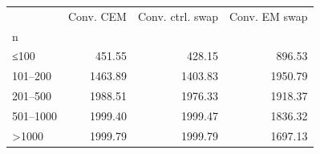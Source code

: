 \begin{tabular}{lrrr}
\toprule
 & Conv. CEM & Conv. ctrl. swap & Conv. EM swap \\
n &  &  &  \\
\midrule
≤100 & 451.55 & 428.15 & 896.53 \\
101–200 & 1463.89 & 1403.83 & 1950.79 \\
201–500 & 1988.51 & 1976.33 & 1918.37 \\
501–1000 & 1999.40 & 1999.47 & 1836.32 \\
>1000 & 1999.79 & 1999.79 & 1697.13 \\
\bottomrule
\end{tabular}
